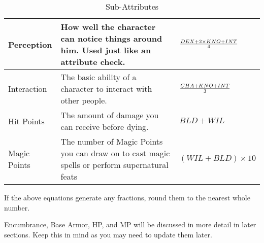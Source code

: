 \documentclass[twoside]{book}
\begin{document}
\begin{table}[htb]
\begin{center}
\begin{tabular}{|p{1in}|p{3in}|p{1.5in}|}
\hline

 Perception & How well the character can notice things
                     around him. Used just like an attribute check.
                     &  \begin{math}  {{  DEX +
                        2  \times    KNO
                     +   INT  }\over{ 4
                     }}  \end{math}
                  \\

\hline

 Interaction & The basic ability of a character to interact
                     with other people. &  \begin{math}  {{CHA +
                     KNO + INT}\over{ 3 }}  \end{math}
                  \\

\hline

 Hit Points & The amount of damage you can receive before
                     dying. &  \begin{math}BLD + WIL
                    \end{math}
                  \\

\hline

 Magic Points & The number of Magic Points you can draw on to
                     cast magic spells or perform supernatural feats
                     &  \begin{math}     (   WIL 
                      +   BLD   )   
                     \times     10     \end{math}
                  \\

\hline


  \end{tabular}
  
\caption{Sub-Attributes}
  
  \end{center}
\end{table}
  
    {  
    If the above equations generate any fractions, round
               them to the nearest whole number. 
    }
  
    {  
    Encumbrance, Base Armor, HP, and MP will be
               discussed in more detail in later sections. Keep this in
               mind as you may need to update them later. 
    }
  
    
\end{document}
